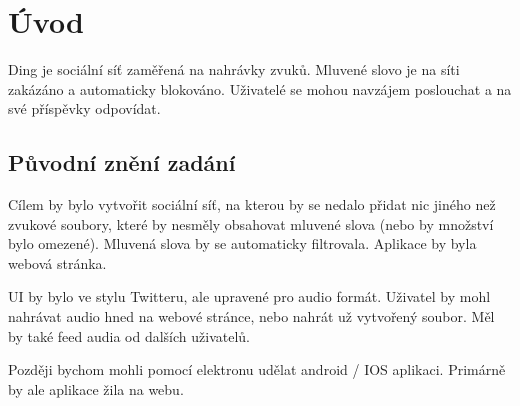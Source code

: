 \section{Úvod}
Ding je sociální síť zaměřená na nahrávky zvuků. Mluvené slovo je na síti zakázáno
a automaticky blokováno. Uživatelé se mohou navzájem poslouchat a na své příspěvky
odpovídat.

\subsection{Původní znění zadání}
Cílem by bylo vytvořit sociální síť, na kterou by se nedalo přidat nic jiného
než zvukové soubory, které by nesměly obsahovat mluvené slova (nebo by množství
bylo omezené). Mluvená slova by se automaticky filtrovala. Aplikace by byla
webová stránka.

UI by bylo ve stylu Twitteru, ale upravené pro audio formát. Uživatel by mohl
nahrávat audio hned na webové stránce, nebo nahrát už vytvořený soubor. Měl by
také feed audia od dalších uživatelů.

Později bychom mohli pomocí elektronu udělat android / IOS aplikaci. Primárně
by ale aplikace žila na webu. 
